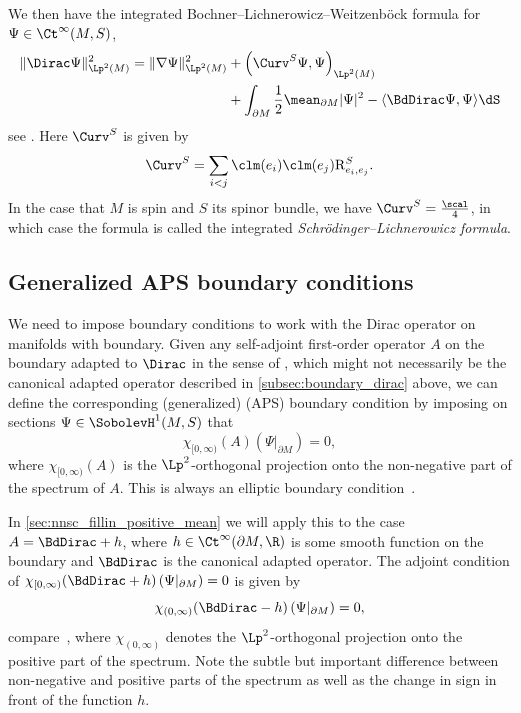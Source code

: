 \documentclass[a4paper,11pt]{amsart}
\numberwithin{equation}{section}
\begin{document}
We then have the integrated Bochner--Lichnerowicz--Weitzenböck formula for \(\Psi\in\Ct^\infty(M, S)\),
\begin{align}\label{eq:schroedinger_lichnerowicz}
    \| \Dirac \Psi \|_{\Lp^2(M)}^2 = \| \nabla \Psi \|_{\Lp^2(M)}^2 &+ \left(\Curv^S \Psi, \Psi\right)_{\Lp^2(M)} \\
    &+ \int_{\partial M} \frac{1}{2} \mean_{\partial M} |\Psi|^2 - \langle \BdDirac \Psi, \Psi \rangle \dS \nonumber
\end{align}
see \cite[Appendix 1, equation (27)]{Baer-Ballmann:Guide-Boundary-value-problems-Dirac}.
Here $\Curv^S$ is given by
\begin{equation*}
    \Curv^S = \sum_{i < j} \clm(e_i) \clm(e_j) \mathrm{R}^{S}_{e_i, e_j}.
\end{equation*}
In the case that \(M\) is spin and \(S\) its spinor bundle, we have \(\Curv^S = \frac{\scal}{4}\), in which case the formula  is called the integrated \emph{Schrödinger--Lichnerowicz formula}.


\subsection{Generalized APS boundary conditions}\label{subsec:APS}
We need to impose boundary conditions to work with the Dirac operator on manifolds with boundary.
Given any self-adjoint first-order operator \(A\) on the boundary adapted to \(\Dirac\) in the sense of \cite[\S 3.2]{Baer-Ballmann:Guide-Boundary-value-problems-Dirac}, which might not necessarily be the canonical adapted operator described in \cref{subsec:boundary_dirac} above, we can define the corresponding (generalized) \textcite{APS} (APS) boundary condition by imposing on sections \(\Psi \in \SobolevH^{1}(M, S)\) that 
\[
\chi_{[0,\infty)}(A)\left(\Psi|_{\partial M}\right) = 0,
\]
where \(\chi_{[0,\infty)}(A)\) is the \(\Lp^2\)-orthogonal projection onto the non-negative part of the spectrum of \(A\).
This is always an elliptic boundary condition~\cite[Example~4.21]{Baer-Ballmann:Guide-Boundary-value-problems-Dirac}.

In \cref{sec:nnsc_fillin_positive_mean} we will apply this to the case \(A = \BdDirac + h\), where \(h \in \Ct^\infty(\partial M, \R)\) is some smooth function on the boundary and \(\BdDirac\) is the canonical adapted operator.
The adjoint condition of \(\chi_{[0,\infty)}(\BdDirac + h)\left(\Psi|_{\partial M}\right) = 0\) is given by
\[
\chi_{(0,\infty)}(\BdDirac - h)\left(\Psi|_{\partial M}\right) = 0,
\]
compare~\cite[\S 4.3]{Baer-Ballmann:Guide-Boundary-value-problems-Dirac}, where \(\chi_{(0,\infty)}\) denotes the \(\Lp^2\)-orthogonal projection onto the positive part of the spectrum. 
Note the subtle but important difference between non-negative and positive parts of the spectrum as well as the change in sign in front of the function \(h\).
\end{document}
